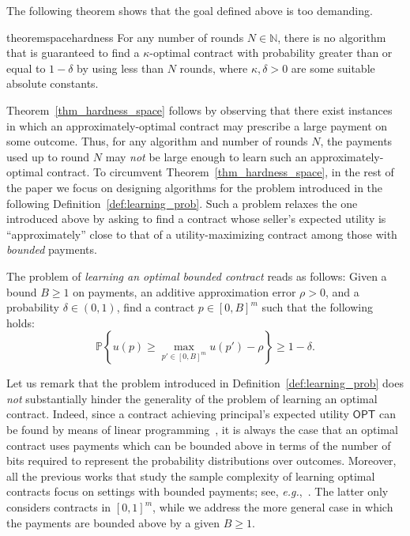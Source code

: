The following theorem shows that the goal defined above is too demanding.
%
\begin{restatable}{theorem}{spacehardness}\label{thm_hardness_space} 
	For any number of rounds $N \in \mathbb{N}$, there is no algorithm that is guaranteed to find a $\kappa$-optimal contract with probability greater than or equal to $1 - \delta$ by using less than $N$ rounds, where $\kappa, \delta > 0$ are some suitable absolute constants.
\end{restatable}
%
Theorem~\ref{thm_hardness_space} follows by observing that there exist instances in which an approximately-optimal contract may prescribe a large payment on some outcome.
%
Thus, for any algorithm and number of rounds $N$, the payments used up to round $N$ may \emph{not} be large enough to learn such an approximately-optimal contract. To circumvent Theorem~\ref{thm_hardness_space}, in the rest of the paper we focus on designing algorithms for the problem introduced in the following Definition~\ref{def:learning_prob}.
%
Such a problem relaxes the one introduced above by asking to find a contract whose seller's expected utility is ``approximately'' close to that of a utility-maximizing contract among those with  \emph{bounded} payments. %
%
%
\begin{definition}\label{def:learning_prob}
	The problem of \emph{learning an optimal bounded contract} reads as follows: Given a bound $B \geq 1$ on payments, an additive approximation error $\rho > 0$, and a probability $\delta \in (0,1)$, find a contract $p \in [0,B]^m$ such that the following holds:
	\[
		\mathbb{P} \left\{  u(p) \geq \max_{p' \in [0,B]^m} u(p') - \rho \right\} \geq 1-\delta.
	\]
\end{definition}
%
Let us remark that the problem introduced in Definition~\ref{def:learning_prob} does \emph{not} substantially hinder the generality of the problem of learning an optimal contract.
%
Indeed, since a contract achieving principal's expected utility $\mathsf{OPT} $ can be found by means of linear programming~\citep{dutting2021complexity}, it is always the case that an optimal contract uses payments which can be bounded above in terms of the number of bits required to represent the probability distributions over outcomes.
%
Moreover, all the previous works that study the sample complexity of learning optimal contracts focus on settings with bounded payments; see, \emph{e.g.},~\citep{zhu2022sample}.
%
The latter only considers contracts in $[0,1]^m$, while we address the more general case in which the payments are bounded above by a given $B \geq 1$.


